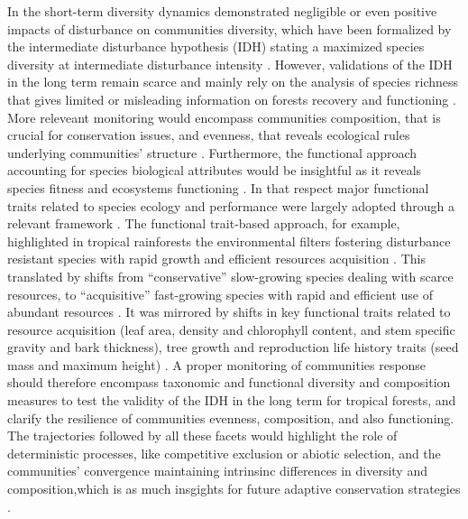 \documentclass[fleqn,10pt]{ArtEcoFoG} %
\theoremstyle{definition}
\theoremstyle{definition}
\theoremstyle{definition}
\theoremstyle{remark}
\begin{document}
In the short-term diversity dynamics demonstrated negligible or even
positive impacts of disturbance on communities diversity, which have
been formalized by the intermediate disturbance hypothesis (IDH) stating
a maximized species diversity at intermediate disturbance intensity
\citep{Molino2001, Kariuki2006a, Berry2008a}. However, validations of
the IDH in the long term remain scarce and mainly rely on the analysis
of species richness that gives limited or misleading information on
forests recovery and functioning \citep{Martin2015, Chaudhary2016}. More
releveant monitoring would encompass communities composition, that is
crucial for conservation issues, and evenness, that reveals ecological
rules underlying communities' structure
\citep{Magurran1988, Lavorel2002, Bellwood2006}. Furthermore, the
functional approach accounting for species biological attributes would
be insightful as it reveals species fitness and ecosystems functioning
\citep{Violle2007b, Moretti2009, Baraloto2012a, Scheiter2013}. In that
respect major functional traits related to species ecology and
performance were largely adopted through a relevant framework
\citep{Diaz2005, Villeger2008a}. The functional trait-based approach,
for example, highlighted in tropical rainforests the environmental
filters fostering disturbance resistant species with rapid growth and
efficient resources acquisition \citep{Molino2001, Haddad2008}. This
translated by shifts from ``conservative'' slow-growing species dealing
with scarce resources, to ``acquisitive'' fast-growing species with
rapid and efficient use of abundant resources
\citep{TerSteege2001, Reich2014, Herault2011}. It was mirrored by shifts
in key functional traits related to resource acquisition (leaf area,
density and chlorophyll content, and stem specific gravity and bark
thickness), tree growth and reproduction life history traits (seed mass
and maximum height) \citep{Wright2004, Westoby2006a, Chave2009b}. A
proper monitoring of communities response should therefore encompass
taxonomic and functional diversity and composition measures to test the
validity of the IDH in the long term for tropical forests, and clarify
the resilience of communities evenness, composition, and also
functioning. The trajectories followed by all these facets would
highlight the role of deterministic processes, like competitive
exclusion or abiotic selection, and the communities' convergence
maintaining intrinsinc differences in diversity and composition,which is
as much insgights for future adaptive conservation strategies
\citep{Adler2007}.
\end{document}
